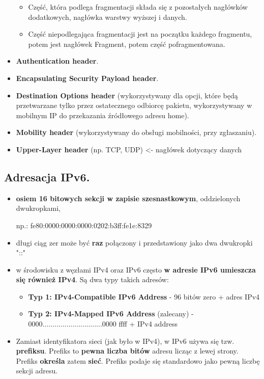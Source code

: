\documentclass[../main.tex]{subfiles}
\begin{document}
\begin{itemize}
\begin{itemize}
            \item Część, która podlega fragmentacji składa się z pozostałych nagłówków dodatkowych, nagłówka warstwy wyższej i danych.
            \item Część niepodlegająca fragmentacji jest na początku każdego fragmentu, potem jest nagłówek Fragment, potem część pofragmentowana.
        \end{itemize}
        \item \textbf{Authentication header}.
        \item \textbf{Encapsulating Security Payload header}.
        \item \textbf{Destination Options header} (wykorzystywany dla opcji, które będą przetwarzane tylko przez ostatecznego odbiorcę pakietu, wykorzystywany w mobilnym IP do przekazania źródłowego adresu home).
        \item \textbf{Mobility header} (wykorzystywany do obsługi mobilności, przy zgłaszaniu).
        \item \textbf{Upper-Layer header} (np. TCP, UDP) <- nagłówek dotyczący danych
    \end{itemize}

    \subsection{Adresacja IPv6.}
    \begin{itemize}
        \item \textbf{osiem 16 bitowych sekcji w zapisie szesnastkowym}, oddzielonych dwukropkami,

        np.: fe80:0000:0000:0000:0202:b3ff:fe1e:8329
        \item długi ciąg zer może być \textbf{raz} połączony i przedstawiony jako dwa dwukropki "::"
        \item w środowisku z węzłami IPv4 oraz IPv6 często \textbf{w adresie IPv6 umieszcza się również IPv4}. Są dwa typy takich adresów:
        \begin{itemize}
            \item \textbf{Typ 1: IPv4-Compatible IPv6 Address} - 96 bitów zero + adres IPv4
            \item \textbf{Typ 2: IPv4-Mapped IPv6 Address} (zalecany) - $0000..............................0000$ ffff + IPv4 address
        \end{itemize}
        \item Zamiast identyfikatora sieci (jak było w IPv4), w IPv6 używa się tzw. \textbf{prefiksu}. Prefiks to \textbf{pewna liczba bitów} adresu licząc z lewej strony. Prefiks \textbf{określa} zatem \textbf{sieć}. Prefiks podaje się standardowo jako pewną liczbę sekcji adresu.
    \end{itemize}
\end{document}
